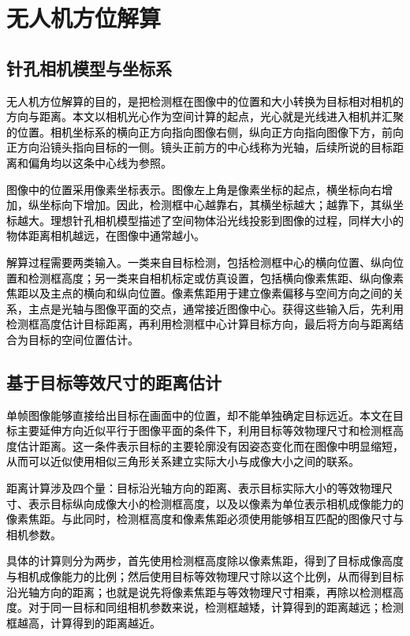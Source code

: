 \section{无人机方位解算}

\subsection{针孔相机模型与坐标系}

\textcolor{black}{无人机方位解算的目的，是把检测框在图像中的位置和大小转换为目标相对相机的方向与距离。本文以相机光心作为空间计算的起点，光心就是光线进入相机并汇聚的位置。相机坐标系的横向正方向指向图像右侧，纵向正方向指向图像下方，前向正方向沿镜头指向目标的一侧。镜头正前方的中心线称为光轴，后续所说的目标距离和偏角均以这条中心线为参照。}

\textcolor{black}{图像中的位置采用像素坐标表示。图像左上角是像素坐标的起点，横坐标向右增加，纵坐标向下增加。因此，检测框中心越靠右，其横坐标越大；越靠下，其纵坐标越大。理想针孔相机模型描述了空间物体沿光线投影到图像的过程，同样大小的物体距离相机越远，在图像中通常越小。}

\textcolor{black}{解算过程需要两类输入。一类来自目标检测，包括检测框中心的横向位置、纵向位置和检测框高度；另一类来自相机标定或仿真设置，包括横向像素焦距、纵向像素焦距以及主点的横向和纵向位置\cite{zhang_calib}。像素焦距用于建立像素偏移与空间方向之间的关系，主点是光轴与图像平面的交点，通常接近图像中心。获得这些输入后，先利用检测框高度估计目标距离，再利用检测框中心计算目标方向，最后将方向与距离结合为目标的空间位置估计。}

\subsection{基于目标等效尺寸的距离估计}

\textcolor{black}{单帧图像能够直接给出目标在画面中的位置，却不能单独确定目标远近。本文在目标主要延伸方向近似平行于图像平面的条件下，利用目标等效物理尺寸和检测框高度估计距离。这一条件表示目标的主要轮廓没有因姿态变化而在图像中明显缩短，从而可以近似使用相似三角形关系建立实际大小与成像大小之间的联系。}

\textcolor{black}{距离计算涉及四个量：目标沿光轴方向的距离、表示目标实际大小的等效物理尺寸、表示目标纵向成像大小的检测框高度，以及以像素为单位表示相机成像能力的像素焦距。与此同时，检测框高度和像素焦距必须使用能够相互匹配的图像尺寸与相机参数。}

\textcolor{black}{具体的计算则分为两步，首先使用检测框高度除以像素焦距，得到了目标成像高度与相机成像能力的比例；然后使用目标等效物理尺寸除以这个比例，从而得到目标沿光轴方向的距离；也就是说先将像素焦距与等效物理尺寸相乘，再除以检测框高度。对于同一目标和同组相机参数来说，检测框越矮，计算得到的距离越远；检测框越高，计算得到的距离越近。}

